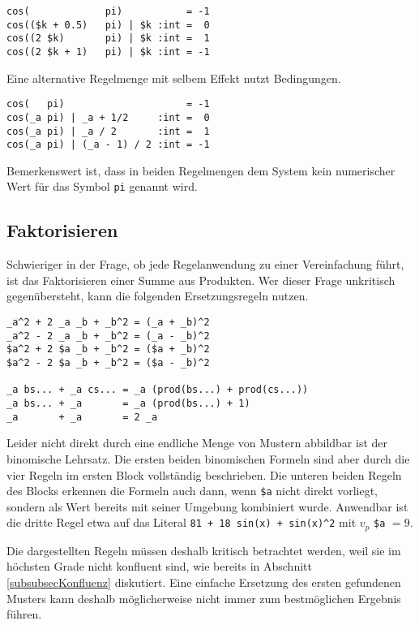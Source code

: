 \begin{verbatim}
cos(             pi)           = -1
cos(($k + 0.5)   pi) | $k :int =  0
cos((2 $k)       pi) | $k :int =  1
cos((2 $k + 1)   pi) | $k :int = -1
\end{verbatim}

Eine alternative Regelmenge mit selbem Effekt nutzt Bedingungen.

\begin{verbatim}
cos(   pi)                     = -1
cos(_a pi) | _a + 1/2     :int =  0
cos(_a pi) | _a / 2       :int =  1
cos(_a pi) | (_a - 1) / 2 :int = -1
\end{verbatim}

Bemerkenswert ist, dass in beiden Regelmengen dem System kein numerischer Wert für das Symbol \verb|pi| genannt wird.

\subsection{Faktorisieren}
Schwieriger in der Frage, ob jede Regelanwendung zu einer Vereinfachung führt, ist das Faktorisieren einer Summe aus Produkten. Wer dieser Frage unkritisch gegenübersteht, kann die folgenden Ersetzungsregeln nutzen.

\begin{verbatim}
_a^2 + 2 _a _b + _b^2 = (_a + _b)^2
_a^2 - 2 _a _b + _b^2 = (_a - _b)^2
$a^2 + 2 $a _b + _b^2 = ($a + _b)^2
$a^2 - 2 $a _b + _b^2 = ($a - _b)^2

_a bs... + _a cs... = _a (prod(bs...) + prod(cs...))
_a bs... + _a       = _a (prod(bs...) + 1)
_a       + _a       = 2 _a
\end{verbatim}

Leider nicht direkt durch eine endliche Menge von Mustern abbildbar ist der binomische Lehrsatz. Die ersten beiden binomischen Formeln sind aber durch die vier Regeln im ersten Block vollständig beschrieben. Die unteren beiden Regeln des Blocks erkennen die Formeln auch dann, wenn \verb|$a| nicht direkt vorliegt, sondern als Wert bereits mit seiner Umgebung kombiniert wurde. Anwendbar ist die dritte Regel etwa auf das Literal \verb|81 + 18 sin(x) + sin(x)^2| mit $v_p$ \verb|$a| $= 9$.

Die dargestellten Regeln müssen deshalb kritisch betrachtet werden, weil sie im höchsten Grade nicht konfluent sind, wie bereits in Abschnitt \ref{subsubsecKonfluenz} diskutiert. Eine einfache Ersetzung des ersten gefundenen Musters kann deshalb möglicherweise nicht immer zum bestmöglichen Ergebnis führen.


















